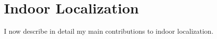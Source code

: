 \documentclass[10pt]{article}
\begin{document}



\section{Indoor Localization}
I now describe in detail my main contributions to indoor localization. %

\end{document}
